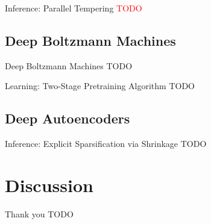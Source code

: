 \documentclass{beamer}
\newcommand{\tred}[1]{\textcolor{red}{#1}}
\begin{document}
\begin{frame}{Inference: Parallel Tempering}
    \tred{TODO}
\end{frame}

\subsection{Deep Boltzmann Machines}

\begin{frame}{Deep Boltzmann Machines}
    \alert{TODO}
\end{frame}

\begin{frame}{Learning: Two-Stage Pretraining Algorithm}
    \alert{TODO}
\end{frame}

\subsection{Deep Autoencoders}

\begin{frame}{Inference: Explicit Sparsification via Shrinkage}
    \alert{TODO}
\end{frame}


\section{Discussion}

\begin{frame}{Thank you}
    \alert{TODO}
\end{frame}





\end{document}
